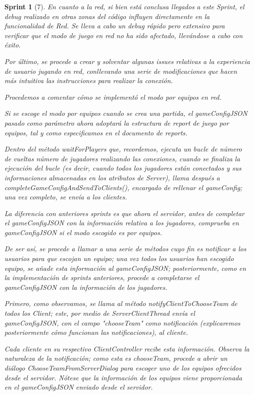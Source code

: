\documentclass{article}
\theoremstyle{break}
\newtheorem*{sprint}{Sprint}
\begin{document}
\begin{sprint}[7]

En cuanto a la red, si bien está conclusa llegados a este Sprint, el debug realizado en otras zonas del código influyen directamente en la funcionalidad de Red. Se lleva a cabo un debug rápido pero extensivo para verificar que el modo de juego en red no ha sido afectado, llevándose a cabo con éxito.

Por último, se procede a crear y solventar algunas issues relativas a la experiencia de usuario jugando en red, conllevando una serie de modificaciones que hacen más intuitiva las instrucciones para realizar la conexión.

Procedemos a comentar cómo se implementó el modo por equipos en red.

Si se escoge el modo por equipos cuando se crea una partida, el gameConfigJSON pasado como parámetro ahora adoptará la estructura de report de juego por equipos, tal y como especificamos en el documento de reports.

Dentro del método waitForPlayers que, recordemos, ejecuta un bucle de número de vueltas número de jugadores realizando las conexiones, cuando se finaliza la ejecución del bucle (es decir, cuando todos los jugadores están conectados y sus informaciones almacenadas en los atributos de Server), llama después a completeGameConfigAndSendToClients(), encargado de rellenar el gameConfig; una vez completo, se envía a los clientes.

La diferencia con anteriores sprints es que ahora el servidor, antes de completar el gameConfigJSON con la información relativa a los jugadores, comprueba en gameConfigJSON si el modo escogido es por equipos.

De ser así, se procede a llamar a una serie de métodos cuyo fin es notificar a los usuarios para que escojan un equipo; una vez todos los usuarios han escogido equipo, se añade esta información al gameConfigJSON; posteriormente, como en la implementación de sprints anteriores, procede a completarse el gameConfigJSON con la información de los jugadores.

Primero, como observamos, se llama al método notifyClientToChooseTeam de todos los Client; este, por medio de ServerClientThread envía el gameConfigJSON, con el campo "chooseTeam" como notificación (explicaremos posteriormente cómo funcionan las notificaciones), al cliente.

Cada cliente en su respectivo ClientController recibe esta información. Observa la naturaleza de la notificación; como esta es chooseTeam, procede a abrir un diálogo ChooseTeamFromServerDialog para escoger uno de los equipos ofrecidos desde el servidor. Nótese que la información de los equipos viene proporcionada en el gameConfigJSON enviado desde el servidor.


\end{sprint}
\end{document}
